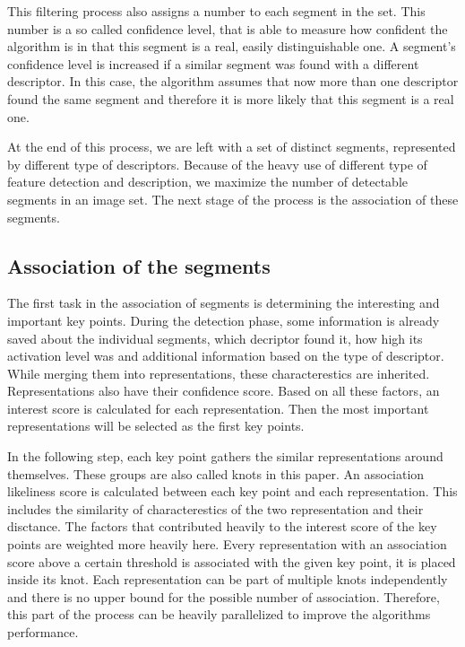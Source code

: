 This filtering process also assigns a number to each segment in the set. This number is a so called confidence level, that is able to measure how confident the algorithm is in that this segment is a real, easily distinguishable one. A segment's confidence level is increased if a similar segment was found with a different descriptor. In this case, the algorithm assumes that now more than one descriptor found the same segment and therefore it is more likely that this segment is a real one. 

At the end of this process, we are left with a set of distinct segments, represented by different type of descriptors. Because of the heavy use of different type of feature detection and description, we maximize the number of detectable segments in an image set. The next stage of the process is the association of these segments.

\subsection{Association of the segments} %

The first task in the association of segments is determining the interesting and important key points. During the detection phase, some information is already saved about the individual segments, which decriptor found it, how high its activation level was and additional information based on the type of descriptor. While merging them into representations, these characterestics are inherited. Representations also have their confidence score. Based on all these factors, an interest score is calculated for each representation. Then the most important representations will be selected as the first key points.

In the following step, each key point gathers the similar representations around themselves. These groups are also called knots in this paper. An association likeliness score is calculated between each key point and each representation. This includes the similarity of characterestics of the two representation and their disctance. The factors that contributed heavily to the interest score of the key points are weighted more heavily here. Every representation with an association score above a certain threshold is associated with the given key point, it is placed inside its knot. Each representation can be part of multiple knots independently and there is no upper bound for the possible number of association. Therefore, this part of the process can be heavily parallelized to improve the algorithms performance.

